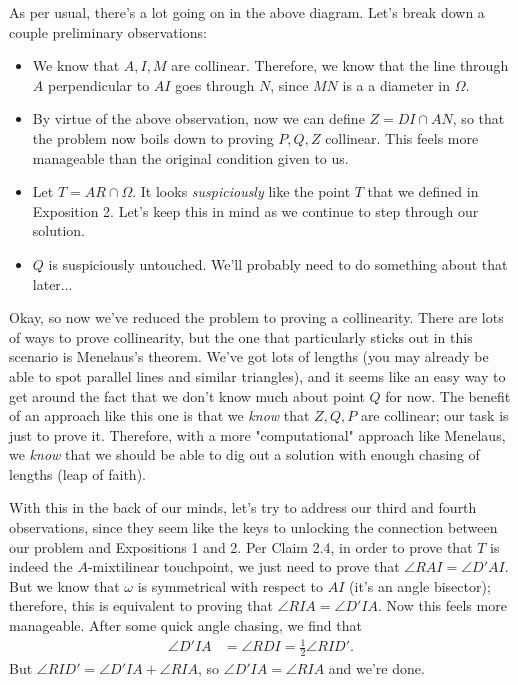As per usual, there's a lot going on in the above diagram. Let's break down a couple preliminary observations: 
\begin{itemize}
    \item We know that $A,I,M$ are collinear. Therefore, we know that the line through $A$ perpendicular to $AI$ goes through $N$, since $MN$ is a a diameter in $\Omega$.
    \item By virtue of the above observation, now we can define $Z = DI\cap AN$, so that the problem now boils down to proving $P,Q,Z$ collinear. This feels more manageable than the original condition given to us.
    \item Let $T = AR\cap \Omega$. It looks \textit{suspiciously} like the point $T$ that we defined in Exposition 2. Let's keep this in mind as we continue to step through our solution.
    \item $Q$ is suspiciously untouched. We'll probably need to do something about that later...
\end{itemize}

Okay, so now we've reduced the problem to proving a collinearity. There are lots of ways to prove collinearity, but the one that particularly sticks out in this scenario is Menelaus's theorem. We've got lots of lengths (you may already be able to spot parallel lines and similar triangles), and it seems like an easy way to get around the fact that we don't know much about point $Q$ for now. The benefit of an approach like this one is that we \textit{know} that $Z, Q, P$ are collinear; our task is just to prove it. Therefore, with a more "computational" approach like Menelaus, we \textit{know} that we should be able to dig out a solution with enough chasing of lengths (leap of faith).\V

With this in the back of our minds, let's try to address our third and fourth observations, since they seem like the keys to unlocking the connection between our problem and Expositions 1 and 2. Per Claim 2.4, in order to prove that $T$ is indeed the $A$-mixtilinear touchpoint, we just need to prove that $\angle{RAI} = \angle{D'AI}$. But we know that $\omega$ is symmetrical with respect to $AI$ (it's an angle bisector); therefore, this is equivalent to proving that $\angle{RIA} = \angle{D'IA}$. Now this feels more manageable. After some quick angle chasing, we find that 
\begin{align*}
    \angle{D'IA} &= \angle{RDI} = \frac{1}{2}\angle{RID'}.
\end{align*}
But $\angle{RID'} = \angle{D'IA} + \angle{RIA}$, so $\angle{D'IA} = \angle{RIA}$ and we're done. \V

